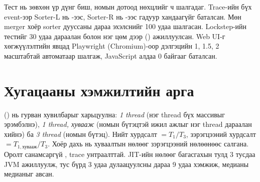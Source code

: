 Тест нь зөвхөн үр дүнг биш, номын дотоод нөхцлийг ч шалгадаг. Trace-ийн бүх event-ээр Sorter-L нь
\code{[0, mid)}-ээс, Sorter-R нь \code{[mid, n)}-ээс гадуур хандаагүйг баталсан. Мөн merger хоёр sorter дууссаны дараа
эхэлснийг 100 удаа шалгасан. Lockstep-ийн тестийг 30 удаа дараалан болон нэг цөм дээр () ажиллуулсан.
Web UI-г хөгжүүлэлтийн явцад Playwright (Chromium)-оор дэлгэцийн 1, 1.5, 2 масштабтай автоматаар шалгаж,
JavaScript алдаа 0 байгааг баталсан.

\section{Хугацааны хэмжилтийн арга}
 () нь гурван хувилбарыг харьцуулна: \emph{1 thread} (нэг thread бүх массивыг
эрэмбэлнэ), \emph{1 thread, хувааж} (номын бүтэцтэй ижил ажлыг нэг thread дараалан хийнэ) ба \emph{3 thread} (номын
бүтэц). Нийт хурдсалт $= T_{1}/T_{3}$, зэрэгцээний хурдсалт $= T_{1,\text{хувааж}}/T_{3}$. Хоёр дахь нь хуваалтын
нөлөөг зэрэгцээний нөлөөнөөс салгана. Оролт санамсаргүй , trace унтраалттай. JIT-ийн нөлөөг багасгахын тулд
3 тусдаа JVM ажиллуулж, тус бүрд 3 удаа дулаацуулсны дараа 9 удаа хэмжиж, медианы медианыг авсан.
